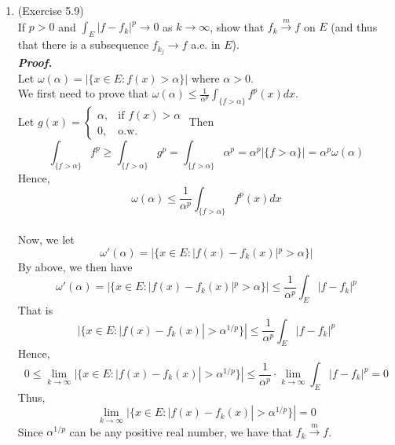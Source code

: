 \documentclass[a4paper,11pt]{article}
\begin{document}
\begin{enumerate}
\item (Exercise 5.9)\\
 If $p > 0$ and $\int_{E} |f - f_k|^p \to 0$ as $k \to \infty$, show that $f_k \overset{m}{\to} f$ on $E$ (and thus that there is a subsequence $f_{k_j} \to f$ a.e. in $E$).\\
 \newline
 \textit{\textbf {Proof.}}\\
 Let $\omega(\alpha) = |\{ x \in E : f(x) > \alpha \}|$ where $\alpha > 0$.\\
 We first need to prove that $\omega(\alpha) \leq \frac{1}{\alpha^p} \int_{ \{f > \alpha\} } f^p(x) dx$.\\
 Let $g(x) = \left\{ \begin{array}{ll}
 					\alpha, & \mbox{if $f(x) > \alpha$} \\
 					0, & \mbox{o.w.}
 					\end{array}
 					\right.$
 Then
 $$\int_{\{ f > \alpha \}} f^p \geq \int_{\{ f > \alpha \}} g^p = \int_{\{ f > \alpha \}} \alpha^p = \alpha^p |\{ f > \alpha \}| = \alpha^p \omega(\alpha)$$
 Hence, 
 $$\omega(\alpha) \leq \frac{1}{\alpha^p} \int_{ \{f > \alpha\} } f^p(x) dx$$\\

 Now, we let
 $$\omega'(\alpha) = |\{ x \in E: |f(x) - f_k(x)|^p > \alpha \}|$$
 By above, we then have
 $$\omega'(\alpha) = |\{ x \in E: |f(x) - f_k(x)|^p > \alpha \}| \leq \frac{1}{\alpha^p} \int_{E} |f - f_k|^p$$
 That is
 $$|\{ x \in E: |f(x) - f_k(x)| > \alpha^{1/p} \}| \leq \frac{1}{\alpha^p} \int_{E} |f - f_k|^p$$
 Hence,
 $$0 \leq \underset{k \to \infty}{\lim} |\{ x \in E: |f(x) - f_k(x)| > \alpha^{1/p} \}| \leq \frac{1}{\alpha^p} \cdot \underset{k \to \infty}{\lim} \int_{E} |f - f_k|^p = 0$$
 Thus,
 $$\underset{k \to \infty}{\lim} |\{ x \in E: |f(x) - f_k(x)| > \alpha^{1/p} \}| = 0$$
 Since $\alpha^{1/p}$ can be any positive real number, we have that $f_k \overset{m}{\to} f$.\\









\end{enumerate}
\end{document}
